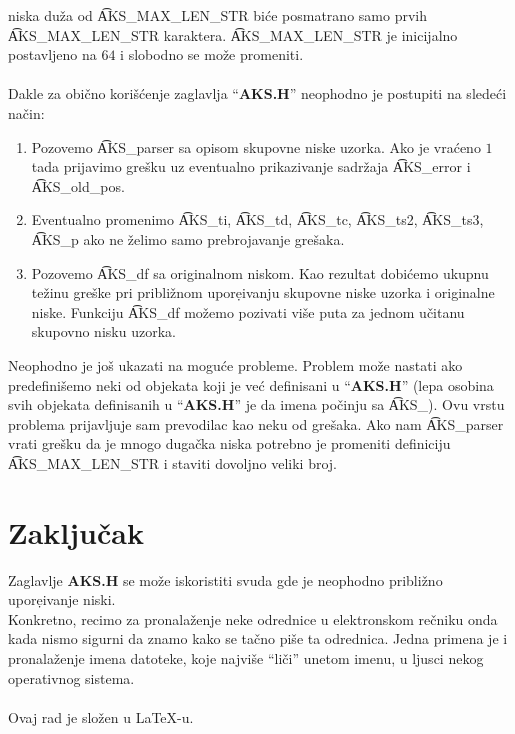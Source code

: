     niska du\v{z}a od \t{AKS\_MAX\_LEN\_STR} bi\'ce posmatrano samo prvih
    \t{AKS\_MAX\_LEN\_STR} karaktera.
    \t{AKS\_MAX\_LEN\_STR} je inicijalno postavljeno na $64$ i slobodno se
    mo\v{z}e promeniti.\\
    \\
    Dakle za obi\v{c}no kori\v{s}\'cenje zaglavlja ``{\bf AKS.H}'' neophodno je
    postupiti na slede\'ci na\v{c}in:
    \begin{enumerate}
      \item
        Pozovemo \t{AKS\_parser} sa opisom skupovne niske uzorka.
        Ako je vra\'ceno $1$ tada prijavimo gre\v{s}ku uz eventualno prikazivanje
        sadr\v{z}aja \t{AKS\_error} i \t{AKS\_old\_pos}.
      \item
        Eventualno promenimo \t{AKS\_ti}, \t{AKS\_td}, \t{AKS\_tc},
        \t{AKS\_ts2}, \t{AKS\_ts3}, \t{AKS\_p} ako ne \v{z}elimo samo
        prebrojavanje gre\v{s}aka.
      \item
        Pozovemo \t{AKS\_df} sa originalnom niskom.
        Kao rezultat dobi\'cemo ukupnu te\v{z}inu gre\v{s}ke pri pribli\v{z}nom
        upore{\d}ivanju skupovne niske uzorka i origi\-nalne niske.
        Funkciju \t{AKS\_df} mo\v{z}emo pozivati vi\v{s}e puta za jednom
        u\v{c}ita\-nu skupovno nisku uzorka.
    \end{enumerate}
    Neophodno je jo\v{s} ukazati na mogu\'ce probleme.
    Problem mo\v{z}e nastati ako predefini\v{s}emo neki od objekata koji je
    ve\'c definisani u ``{\bf AKS.H}'' (lepa oso\-bina svih objekata definisanih
    u ``{\bf AKS.H}'' je da imena po\v{c}inju sa \t{AKS\_}).
    Ovu vrstu problema prijavljuje sam prevodilac kao neku od gre\v{s}aka.
    Ako nam \t{AKS\_parser} vrati gre\v{s}ku da je mnogo duga\v{c}ka niska
    potrebno je promeniti definiciju \t{AKS\_MAX\_LEN\_STR} i staviti
    dovoljno veliki broj.
%
%
  \section{Zaklju\v{c}ak}
    Zaglavlje {\bf AKS.H} se mo\v{z}e iskoristiti svuda gde je neophodno
    pribli\v{z}no upore{\d}i\-vanje niski.\\
    Konkretno, recimo za pronala\v{z}enje neke odrednice u elektronskom
    re\v{c}niku onda kada nismo sigurni da znamo kako se ta\v{c}no pi\v{s}e
    ta odrednica.
    Jedna primena je i pronala\v{z}enje imena datoteke, koje najvi\v{s}e
    ``li\v{c}i'' unetom imenu, u ljusci nekog operativnog sistema.\\
    \\
    Ovaj rad je slo\v{z}en u \LaTeX-u.
%
%
